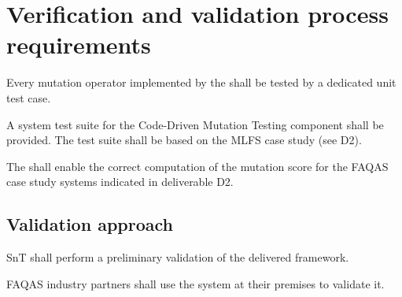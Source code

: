  \section{Verification and validation process requirements}

\RQ{} Every mutation operator implemented by the \FAQAS shall be tested by a dedicated unit test case.

 \RQ{} A system test suite for the Code-Driven Mutation Testing component shall be provided. The test suite shall be based on the MLFS case study (see D2).

 \RQ{} The \FAQAS shall enable the correct computation of the mutation score for the FAQAS case study systems indicated in deliverable D2.

 \subsection{Validation approach}

\RQ{} SnT shall perform a preliminary validation of the delivered framework.

\RQ{} FAQAS industry partners shall use the system at their premises to validate it.
